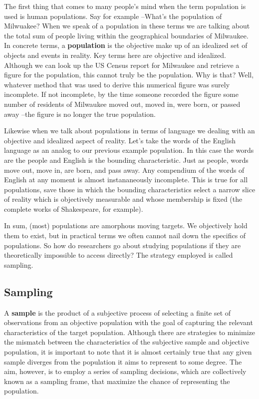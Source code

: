 \documentclass[
  letterpaper,
]{scrbook}
\begin{document}
The first thing that comes to many people's mind when the term
population is used is human populations. Say for example --What's the
population of Milwuakee? When we speak of a population in these terms we
are talking about the total sum of people living within the geographical
boundaries of Milwaukee. In concrete terms, a
\textbf{population} is the objective make up of an
idealized set of objects and events in reality. Key terms here are
objective and idealized. Although we can look up the US Census report
for Milwaukee and retrieve a figure for the population, this cannot
truly be the population. Why is that? Well, whatever method that was
used to derive this numerical figure was surely incomplete. If not
incomplete, by the time someone recorded the figure some number of
residents of Milwaukee moved out, moved in, were born, or passed away
--the figure is no longer the true population.

Likewise when we talk about populations in terms of language we dealing
with an objective and idealized aspect of reality. Let's take the words
of the English language as an analog to our previous example population.
In this case the words are the people and English is the bounding
characteristic. Just as people, words move out, move in, are born, and
pass away. Any compendium of the words of English at any moment is
almost instananeously incomplete. This is true for all populations, save
those in which the bounding characteristics select a narrow slice of
reality which is objectively measurable and whose membership is fixed
(the complete works of Shakespeare, for example).

In sum, (most) populations are amorphous moving targets. We objectively
hold them to exist, but in practical terms we often cannot nail down the
specifics of populations. So how do researchers go about studying
populations if they are theoretically impossible to access directly? The
strategy employed is called sampling.

\hypertarget{sampling}{%
\subsection{Sampling}\label{sampling}}

A \textbf{sample} is the product of a subjective process
of selecting a finite set of observations from an objective population
with the goal of capturing the relevant characteristics of the target
population. Although there are strategies to minimize the mismatch
between the characteristics of the subjective sample and objective
population, it is important to note that it is almost certainly true
that any given sample diverges from the population it aims to represent
to some degree. The aim, however, is to employ a series of sampling
decisions, which are collectively known as a sampling frame, that
maximize the chance of representing the population.
\end{document}

